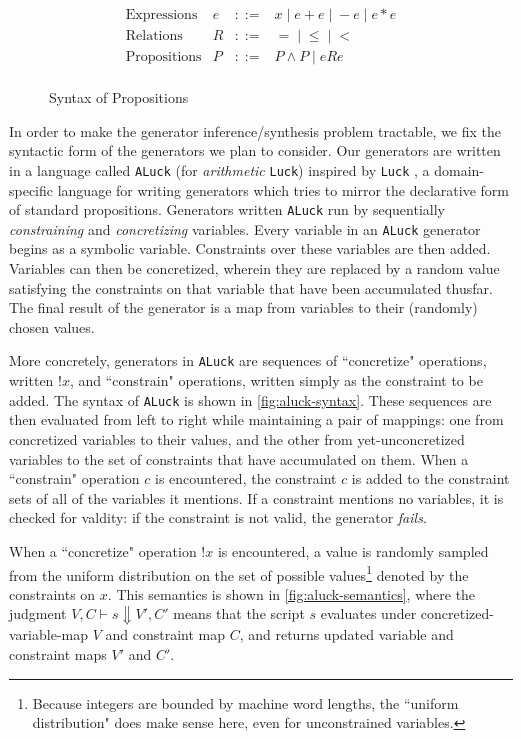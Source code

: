 \documentclass[sigconf,nonacm,review,anonymous]{acmart}
\begin{document}
\begin{figure}
\caption{Syntax of Propositions}
\label{fig:precond-syntax}
$$
\begin{array}{llll}
\text{Expressions} & e & ::= & x \; | \; e + e \; | \; -e \;|\; e*e\\
\text{Relations} & R & ::= & = \;|\; \leq \;|\; <\\
\text{Propositions} & P & ::= & P \wedge P \;|\; e R e\\
\end{array}
$$
\end{figure}

In order to make the generator inference/synthesis problem tractable, we fix the
syntactic form of the generators we plan to consider. Our generators are written
in a language called \texttt{ALuck} (for \textit{arithmetic} \texttt{Luck})
inspired by \texttt{Luck} \cite{luck}, a domain-specific language for writing
generators which tries to mirror the declarative form of standard propositions.
Generators written \texttt{ALuck} run by sequentially \textit{constraining} and
\textit{concretizing} variables. Every variable in an \texttt{ALuck} generator
begins as a symbolic variable. Constraints over these variables are then added.
Variables can then be concretized, wherein they are replaced by a random value
satisfying the constraints on that variable that have been accumulated thusfar.
The final result of the generator is a map from variables to their (randomly)
chosen values.

More concretely, generators in \texttt{ALuck} are sequences of ``concretize"
operations, written $!x$, and ``constrain" operations, written simply as the
constraint to be added. The syntax of \texttt{ALuck} is shown in
\autoref{fig:aluck-syntax}. These sequences are then evaluated from left to
right while maintaining a pair of mappings: one from concretized variables to
their values, and the other from yet-unconcretized variables to the set of
constraints that have accumulated on them.  When a ``constrain" operation $c$ is
encountered, the constraint $c$ is added to the constraint sets of all of the
variables it mentions. If a constraint mentions no variables, it is checked for
valdity: if the constraint is not valid, the generator \emph{fails}.

When a ``concretize" operation $!x$ is encountered, a value is randomly sampled from
the uniform distribution on the set of possible values\footnote{ Because
integers are bounded by machine word lengths, the ``uniform distribution" does
make sense here, even for unconstrained variables.  } denoted by the constraints
on $x$. This semantics is shown in \autoref{fig:aluck-semantics}, where the
judgment $V,C \vdash s \Downarrow V',C'$ means that the script $s$ evaluates
under concretized-variable-map $V$ and constraint map $C$, and returns updated
variable and constraint maps $V'$ and $C'$.
\end{document}
